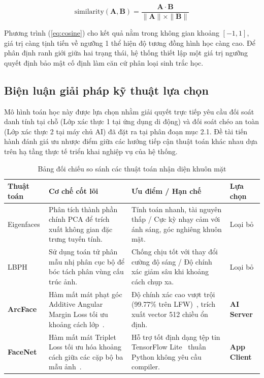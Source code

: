 ﻿\documentclass[../DoAn.tex]{subfiles}
\begin{document}
\begin{equation}
\label{eq:cosine}
    \text{similarity}(\mathbf{A}, \mathbf{B}) = \frac{\mathbf{A} \cdot \mathbf{B}}{\|\mathbf{A}\| \times \|\mathbf{B}\|}
\end{equation}

Phương trình (\ref{eq:cosine}) cho kết quả nằm trong không gian khoảng $[-1, 1]$, giá trị càng tịnh tiến về ngưỡng 1 thể hiện độ tương đồng hình học càng cao. Để phân định ranh giới giữa hai trạng thái, hệ thống thiết lập một giá trị ngưỡng quyết định bảo mật cố định làm căn cứ phân loại sinh trắc học.

\subsection{Biện luận giải pháp kỹ thuật lựa chọn}

Mô hình toán học này được lựa chọn nhằm giải quyết trực tiếp yêu cầu đối soát danh tính tại chỗ (Lớp xác thực 1 tại ứng dụng di động) và đối soát chéo an toàn (Lớp xác thực 2 tại máy chủ AI) đã đặt ra tại phân đoạn mục 2.1. Đề tài tiến hành đánh giá ưu nhược điểm giữa các hướng tiếp cận thuật toán khác nhau dựa trên hạ tầng thực tế triển khai nghiệp vụ của hệ thống.

\begin{table}[ht!]
\centering
\small
\renewcommand{\arraystretch}{1.3}
\caption{Bảng đối chiếu so sánh các thuật toán nhận diện khuôn mặt}
\label{tab:face_comparison}
\begin{tabular}{|>{\raggedright\arraybackslash}p{2.3cm}|>{\raggedright\arraybackslash}p{4.5cm}|>{\raggedright\arraybackslash}p{5.5cm}|>{\centering\arraybackslash}p{1.7cm}|}
\hline
\textbf{Thuật toán} & \textbf{Cơ chế cốt lõi} & \textbf{Ưu điểm / Hạn chế} & \textbf{Lựa chọn} \\ \hline
Eigenfaces & Phân tích thành phần chính PCA để trích xuất không gian đặc trưng tuyến tính. & Tính toán nhanh, tài nguyên thấp / Cực kỳ nhạy cảm với ánh sáng, góc nghiêng khuôn mặt. & Loại bỏ \\ \hline
LBPH & Sử dụng toán tử phân mẫu nhị phân cục bộ để bóc tách phân vùng cấu trúc ảnh. & Chống chịu tốt với thay đổi cường độ sáng / Độ chính xác giảm sâu khi khoảng cách chụp xa. & Loại bỏ \\ \hline
\textbf{ArcFace} & Hàm mất mát phạt góc Additive Angular Margin Loss tối ưu khoảng cách lớp~\cite{deng2019arcface}. & Độ chính xác cao vượt trội (99.77\% trên LFW)~\cite{deng2019arcface}, trích xuất vector 512 chiều ổn định. & \textbf{AI Server} \\ \hline
\textbf{FaceNet} & Hàm mất mát Triplet Loss tối ưu hóa khoảng cách giữa các cặp bộ ba mẫu ảnh~\cite{facenet2015}. & Hỗ trợ tốt định dạng tệp tin TensorFlow Lite~\cite{tensorflow_lite2021} thuần Python không yêu cầu compiler. & \textbf{App Client} \\ \hline
\end{tabular}
\end{table}
\end{document}
